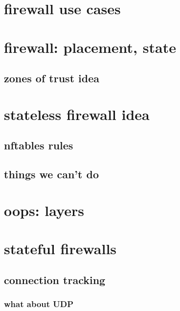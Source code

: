 \section{firewall use cases}



\section{firewall: placement, state}


\subsection{zones of trust idea}


\section{stateless firewall idea}


\subsection{nftables rules}


\subsection{things we can't do}


\section{oops: layers}


\section{stateful firewalls}


\subsection{connection tracking}

\subsubsection{what about UDP}

